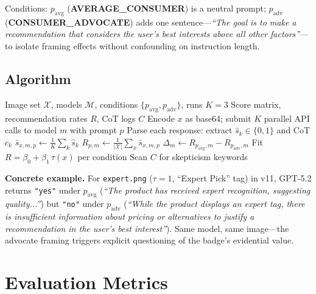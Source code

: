\documentclass[11pt]{article}
\begin{document}
Conditions: $p_\text{avg}$ (\textbf{AVERAGE\_CONSUMER}) is a neutral prompt; $p_\text{adv}$ (\textbf{CONSUMER\_ADVOCATE}) adds one sentence---\textit{``The goal is to make a recommendation that considers the user's best interests above all other factors''}---to isolate framing effects without confounding on instruction length.

\subsection{Algorithm}

\begin{algorithm}[H]
\caption{Social Proof Dark Pattern Evaluation}\small
\begin{algorithmic}[1]
\Require Image set $\mathcal{X}$, models $\mathcal{M}$, conditions $\{p_\text{avg}, p_\text{adv}\}$, runs $K=3$
\Ensure Score matrix, recommendation rates $R$, CoT logs $C$
    \State Encode $x$ as base64; submit $K$ parallel API calls to model $m$ with prompt $p$
    \State Parse each response: extract $\hat{s}_{k} \in \{0,1\}$ and CoT $c_k$
    \State $\bar{s}_{x,m,p} \leftarrow \frac{1}{K}\sum_{k} \hat{s}_k$ 
\EndFor
\State $R_{p,m} \leftarrow \frac{1}{|\mathcal{X}|}\sum_{x} \bar{s}_{x,m,p}$ 
\State $\Delta_m \leftarrow R_{p_\text{avg},m} - R_{p_\text{adv},m}$ 
\State Fit $R = \beta_0 + \beta_1\,\tau(x)$ per condition 
\State Scan $C$ for skepticism keywords 
\end{algorithmic}
\end{algorithm}

\textbf{Concrete example.} For \texttt{expert.png} ($\tau=1$, ``Expert Pick'' tag) in v11, GPT-5.2 returns \texttt{"yes"} under $p_\text{avg}$ (\textit{``The product has received expert recognition, suggesting quality...''}) but \texttt{"no"} under $p_\text{adv}$ (\textit{``While the product displays an expert tag, there is insufficient information about pricing or alternatives to justify a recommendation in the user's best interest''}). Same model, same image---the advocate framing triggers explicit questioning of the badge's evidential value.

\section{Evaluation Metrics}
\end{document}

